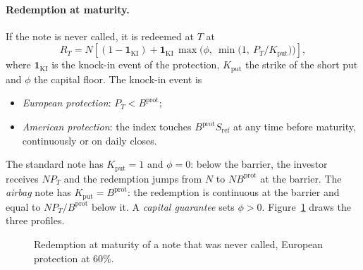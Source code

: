 \documentclass[11pt,a4paper]{article}
\newcommand{\ind}{\mathbf{1}}
\newcommand{\Sref}{S_{\mathrm{ref}}}
\begin{document}
\paragraph{Redemption at maturity.} If the note is never called, it is redeemed at $T$ at
\begin{equation}\label{eq:redemption}
R_T = N\left[(1 - \ind_{\mathrm{KI}}) + \ind_{\mathrm{KI}}\,\max\!\Big(\phi,\ \min\big(1,\ P_T/K_{\mathrm{put}}\big)\Big)\right],
\end{equation}
where $\ind_{\mathrm{KI}}$ is the knock-in event of the protection, $K_{\mathrm{put}}$ the strike of the short put
and $\phi$ the capital floor. The knock-in event is
\begin{itemize}
\item \emph{European protection}: $P_T < B^{\mathrm{prot}}$;
\item \emph{American protection}: the index touches $B^{\mathrm{prot}}\Sref$ at any time before maturity,
continuously or on daily closes.
\end{itemize}
The standard note has $K_{\mathrm{put}} = 1$ and $\phi = 0$: below the barrier, the investor receives
$N P_T$ and the redemption jumps from $N$ to $N B^{\mathrm{prot}}$ at the barrier. The \emph{airbag} note has
$K_{\mathrm{put}} = B^{\mathrm{prot}}$: the redemption is continuous at the barrier and equal to
$N P_T / B^{\mathrm{prot}}$ below it. A \emph{capital guarantee} sets $\phi > 0$. Figure~\ref{fig:redemption}
draws the three profiles.

\begin{figure}[h]
\centering
{}
\caption{Redemption at maturity of a note that was never called, European protection at 60\%.}
\label{fig:redemption}
\end{figure}
\end{document}
